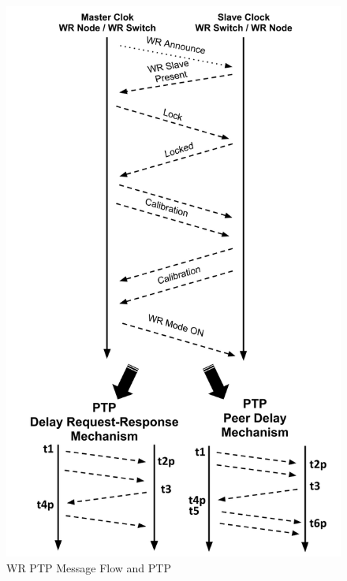 \begin{figure}[!t]
\centering
\includegraphics[scale=0.25]{fig/wr_ptp.png}
\caption{WR PTP Message Flow and PTP}
\label{fig:wr_ptp}
\end{figure}


